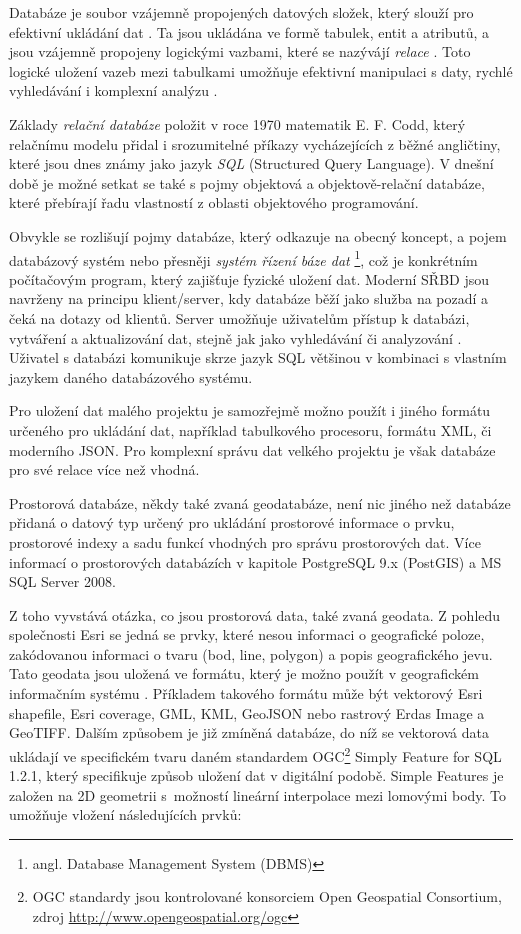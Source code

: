 Databáze je soubor vzájemně propojených datových složek, který slouží pro efektivní ukládání dat \citep{Oppel2009}. Ta jsou ukládána ve formě tabulek, entit a atributů, a jsou vzájemně propojeny logickými vazbami, které se nazývájí {\it relace} \citep{Connolly2005}. Toto logické uložení vazeb mezi tabulkami umožňuje efektivní manipulaci s daty, rychlé vyhledávání i komplexní analýzu \citep{Momjian2001}. 

Základy {\it relační databáze} položit v roce 1970 matematik E. F. Codd, který relačnímu modelu přidal i srozumitelné příkazy vycházejících z běžné angličtiny, které jsou dnes známy jako jazyk {\it SQL} (Structured Query Language)\citep{Zak2001}. V dnešní době je možné setkat se také s pojmy objektová a objektově-relační databáze, které přebírají řadu vlastností z oblasti objektového programování.

Obvykle se rozlišují pojmy databáze, který odkazuje na obecný koncept, a pojem databázový systém nebo přesněji {\it systém řízení báze dat} \footnote{angl. Database Management System (DBMS)}, což je konkrétním počítačovým program, který zajišťuje fyzické uložení dat. Moderní SŘBD jsou navrženy na principu klient/server, kdy databáze běží jako služba na pozadí a čeká na dotazy od klientů. Server umožňuje uživatelům přístup k databázi, vytváření a aktualizování dat, stejně jak jako vyhledávání či analyzování \citep{Connolly2005}. Uživatel s databázi komunikuje skrze jazyk SQL většinou v kombinaci s vlastním jazykem daného databázového systému.

Pro uložení dat malého projektu je samozřejmě možno použít i jiného formátu určeného pro ukládání dat, například tabulkového procesoru, formátu XML, či moderního JSON. Pro komplexní správu dat velkého projektu je však databáze pro své relace více než vhodná. 

Prostorová databáze, někdy také zvaná geodatabáze, není nic jiného než databáze přidaná o datový typ určený pro ukládání prostorové informace o prvku, prostorové indexy a sadu funkcí vhodných pro správu prostorových dat. Více informací o prostorových databázích v kapitole  PostgreSQL 9.x (PostGIS) a  MS SQL Server 2008. 

Z toho vyvstává otázka, co jsou prostorová data, také zvaná geodata. Z pohledu společnosti Esri se jedná se prvky, které nesou informaci o geografické poloze, zakódovanou informaci o tvaru (bod, line, polygon) a popis geografického jevu. Tato geodata jsou uložená ve formátu, který je možno použít v geografickém informačním systému \citep{Esri2006}. Příkladem takového formátu může být vektorový Esri shapefile, Esri coverage, GML, KML, GeoJSON nebo rastrový Erdas Image a GeoTIFF. Dalším způsobem je již zmíněná databáze, do níž se vektorová data ukládají ve specifickém tvaru daném standardem OGC\footnote{OGC standardy jsou kontrolované konsorciem Open Geospatial Consortium, zdroj \url{http://www.opengeospatial.org/ogc}} Simply Feature for SQL 1.2.1, který specifikuje způsob uložení dat v digitální podobě. Simple Features je založen na 2D geometrii s~možností lineární interpolace mezi lomovými body. To umožňuje vložení následujících prvků:


